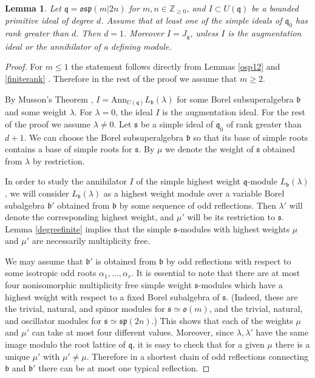\documentclass[12pt]{amsart}
\makeatletter
\def\@putname#1#2#3#4{\def\@@ref{#3}\let\old@bf\bf
        \def\bf##1{\old@bf\if?\noexpand##1?{#4}\else##1\fi}%
	#1{#2}%
        \let\bf\old@bf}
\def\@putname#1#2#3#4{\def\@@ref{#3}\let\old@bf\bf	%
	\let\old@reset@font\reset@font			%
        \def\bf##1{\old@bf\if?\noexpand##1?{#4}\else##1\fi}%
	\def\reset@font##1##2{\old@reset@font##1\if?\noexpand##2?{#4}\else##2\fi}#1{#2}%
        \let\bf\old@bf\let\reset@font\old@reset@font}
\let\my@ref=\ref
\def\ref#1{\@putname\my@ref{#1}{#1}{\tiny\rm\@@ref}}
\let\my@cite=\cite
\def\cite#1{\@putname\my@cite{#1}{\@citeb}{\tiny\rm\@@ref}}
\theoremstyle{plain} %
\numberwithin{equation}{section}
\theoremstyle{definition}
\theoremstyle{remark}
\theoremstyle{plain} %
\newtheorem{lemma}[definition]{Lemma}
\renewcommand{\sp}{\mathfrak{sp}}
\newcommand{\so}{\mathfrak{o}}
\newcommand{\osp}{\mathfrak{osp}}
\newcommand{\Ann}{\mathrm{Ann}}
\newcommand{\gs}{\mathfrak{s}}
\def\gb{\mathfrak{b}}
\def\gq{\mathfrak{q}}
\def\gs{\mathfrak{s}}
\makeatother
\begin{document}
  \begin{lemma}\label{boundedideal} Let $\gq=\osp(m|2n)$ for $m, n \in {\mathbb Z}_{\geq 0}$, and $I\subset U(\gq)$ be a bounded primitive ideal of degree $d$. Assume that at least one of the simple ideals of $\gq_{\bar{0}}$ has rank greater than $d$. Then $d=1$. Moreover $I=J_{\mathfrak{q}}$, unless $I$  is the augmentation ideal or  the annihilator of a defining module. 
  \end{lemma}
\begin{proof} For $m \leq 1$ the statement follows directly from Lemmas  \ref{osp12}  and \ref{finiterank}. Therefore in the rest of the proof we assume that $m\geq 2$.

 By Musson's Theorem \cite{Musson}, $I=\Ann_{U(\gq)} L_{\gb}(\lambda)$ for some Borel subsuperalgebra $\gb$ and some weight $\lambda$. For $\lambda=0$, the ideal $I$ is the augmentation ideal. For the rest of the proof we assume $\lambda\neq 0$. Let $\gs$ be a simple ideal of $\gq_{\bar{0}}$ of rank greater than $d+1$. We can choose the Borel subsuperalgebra $\gb$ so that its base of simple roots contains a base of simple roots for
  $\gs$.    By $\mu$ we denote the weight of $\gs$ obtained from $\lambda$ by restriction.
  
 In order to study the annihilator $I$ of the simple highest weight $\gq$-module $L_{\gb}(\lambda)$, we will consider $L_{\gb}(\lambda)$ as a highest weight module over a variable Borel subalgebra $\gb'$ obtained from $\gb$ by some sequence of odd reflections. Then $\lambda'$ will denote the corresponding
  highest weight, and $\mu'$ will be its restriction to $\gs$. Lemma \ref{degreefinite} implies that the simple $\gs$-modules with highest weights $\mu$ and  $\mu'$ are necessarily multiplicity free.
  
  We may assume that $\gb'$ is obtained from $\gb$ by  odd reflections with respect to some isotropic odd  roots $\alpha_1,\dots,\alpha_r$.  It is essential to note that there are at most four nonisomorphic multiplicity free simple  weight $\gs$-modules which have a highest weight with respect to a fixed Borel subalgebra  of $\gs$. (Indeed, these are the trivial, natural, and spinor modules for $\gs \simeq \so (m)$, and the trivial, natural, and oscillator modules for $\gs \simeq \sp (2n)$.)
  This shows that each of the weights $\mu$ and $\mu'$ can take at most four different values. Moreover, since $\lambda,\lambda'$  have the same image modulo the root lattice of $\gq$, it is easy to check that for a given $\mu$ there is a unique $\mu'$ with $\mu'\neq \mu$. Therefore in a shortest chain of odd reflections connecting $\gb$ and $\gb'$ there can be at most one typical reflection. 
 

\end{proof}
\end{document}
